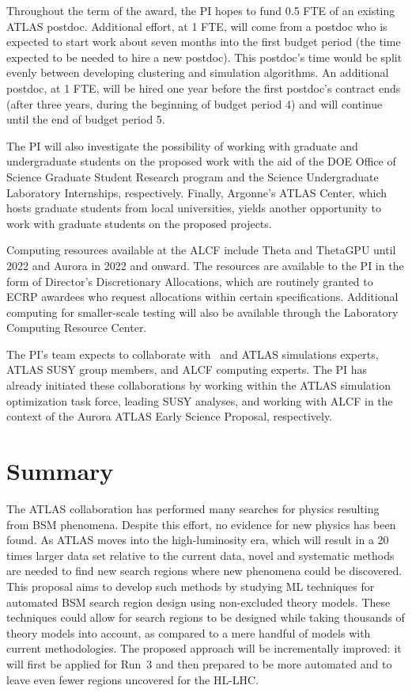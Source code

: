 \documentclass[letter, USenglish, 11pt, subfigure]{article}
\begin{document}
Throughout the term of the award, the PI hopes to fund 0.5 FTE of an existing ATLAS postdoc. Additional effort, at 1 FTE, will come from a postdoc who is expected to start work about seven months into the first budget period (the time expected to be needed to hire a new postdoc). This postdoc's time would be split evenly between developing clustering and simulation algorithms. An additional postdoc, at 1 FTE, will be hired one year before the first postdoc's contract ends (after three years, during the beginning of budget period 4) and will continue until the end of budget period 5.

The PI will also investigate the possibility of working with graduate and undergraduate students on the proposed work with the aid of the DOE Office of Science Graduate Student Research program and the Science Undergraduate Laboratory Internships, respectively. Finally, Argonne's ATLAS Center, which hosts graduate students from local universities, yields another opportunity to work with graduate students on the proposed projects. 

Computing resources available at the ALCF include Theta and ThetaGPU until 2022 and Aurora in 2022 and onward. The resources are available to the PI in the form of Director's Discretionary Allocations, which are routinely granted to ECRP awardees who request allocations within certain specifications. Additional computing for smaller-scale testing will also be available through the Laboratory Computing Resource Center.

The PI's team expects to collaborate with \GEANT\ and ATLAS simulations experts, ATLAS SUSY group members, and ALCF computing experts. The PI has already initiated these collaborations by working within the ATLAS simulation optimization task force, leading SUSY analyses, and working with ALCF in the context of the Aurora ATLAS Early Science Proposal, respectively. 

\section{Summary}

The ATLAS collaboration has performed many searches for physics resulting from BSM phenomena. Despite this effort, no evidence for new physics has been found. As ATLAS moves into the high-luminosity era, which will result in a 20 times larger data set relative to the current data, novel and systematic methods are needed to find new search regions where new phenomena could be discovered. This proposal aims to develop such methods by studying ML techniques for automated BSM search region design using non-excluded theory models. These techniques could allow for search regions to be designed while taking thousands of theory models into account, as compared to a mere handful of models with current methodologies. The proposed approach will be incrementally improved: it will first be applied for Run~3 and then prepared to be more automated and to leave even fewer regions uncovered for the HL-LHC. 
\end{document}
